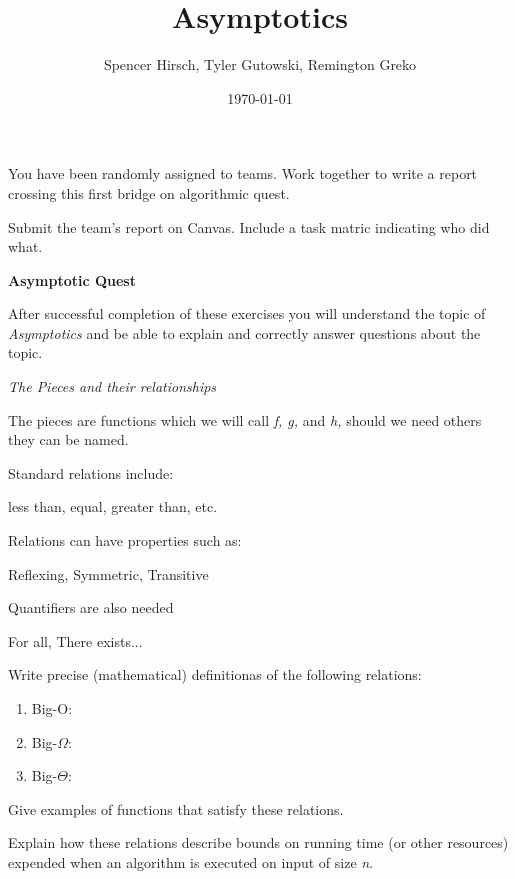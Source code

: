 \documentclass{article}
\begin{document}
\title{Asymptotics}
\author{Spencer Hirsch, Tyler Gutowski, Remington Greko}
\date{\today}
\maketitle

\noindent You have been randomly assigned to teams. Work together to write a report
crossing this first bridge on algorithmic quest.

\medskip

\noindent Submit the team's report on Canvas. Include a task matric indicating who 
did what.

\begin{table}

\end{table}

\bigskip

\noindent \textbf{Asymptotic Quest}

\medskip

After successful completion of these exercises you will understand the topic of
\textit{Asymptotics} and be able to explain and correctly answer questions about
the topic.

\bigskip

\noindent  \textit{The Pieces and their relationships}

\medskip

The pieces are functions which we will call \textit{f, g,} and \textit{h,} should
we need others they can be named.

\medskip

\noindent Standard relations include:

\medskip

\begin{center}
    less than, equal, greater than, etc.
\end{center}

\noindent Relations can have properties such as:

\begin{center}
Reflexing, Symmetric, Transitive
\end{center}

\noindent Quantifiers are also needed

\begin{center}
For all, There exists...
\end{center}

\noindent Write precise (mathematical) definitionas of the following relations:

\begin{enumerate}
    \item Big-O:
    \item Big-$\Omega$:
    \item Big-$\Theta$:
\end{enumerate}

\noindent Give examples of functions that satisfy these relations.

\medskip

\noindent Explain how these relations describe bounds on running time (or other resources)
expended when an algorithm is executed on input of size \textit{n}.
\end{document}
